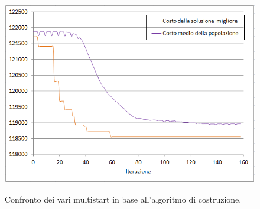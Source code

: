 \begin{figure}[h] 
\begin{center} 
  \includegraphics[scale=0.7]{Images/cost_genetic}\\ 
  \caption{\footnotesize{Confronto dei vari multistart in base all'algoritmo di costruzione.}}
  \label{perf_profile} 
\end{center} 
\end{figure}